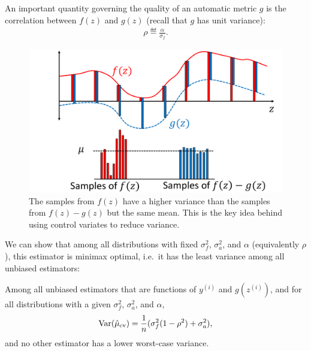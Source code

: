 An important quantity governing the quality of an automatic metric $g$
is the correlation between $f(z)$ and $g(z)$ (recall that $g$ has unit variance):
\begin{align}
\rho \eqdef \frac{\alpha}{\sigma_f}.  %
\end{align}

\begin{figure}
\centering
  \includegraphics[width=\columnwidth]{figures/variance_reduction_extreme}
  \caption{\label{fig:variance_reduction}
  The samples from $f(z)$ have a higher variance than the samples
  from $f(z)-g(z)$ but the same mean. This is the key idea behind using control variates to reduce variance.}
\end{figure}

We can show that among all distributions with
fixed $\sigma^2_f$, $\sigma^2_a$, and $\alpha$ (equivalently $\rho$), this estimator is minimax optimal, i.e.\ it has the least variance among all unbiased estimators:

\begin{theorem}
\label{thm:main}
Among all unbiased
  estimators that are functions of $y^{(i)}$ and $g(z^{(i)})$, and for all distributions with a given $\sigma^2_f$, $\sigma^2_a$, and $\alpha$,
\begin{align}
  \label{eqn:varcontrol}
  \operatorname{Var}(\hat \mu_\text{cv}) = \frac{1}{n} (\sigma^2_f (1 - \rho^2) + \sigma^2_a),
\end{align}
and no other estimator has a lower worst-case variance.
\end{theorem}

